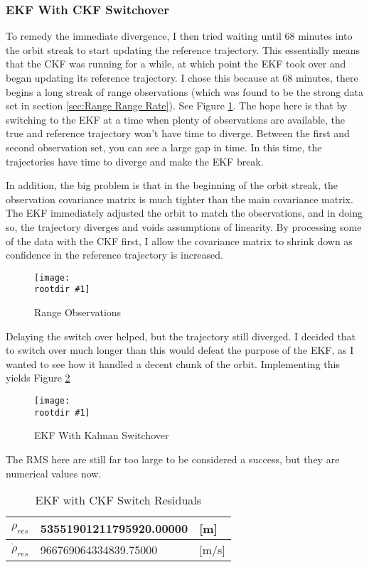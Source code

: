 \documentclass[12pt,a4paper,oneside]{article}
\numberwithin{equation}{section}   		%
\newcommand{\rootdir}{./Figures/}
\newcommand{\figH}[3]{
			\begin{figure}[H]
				\centering
				\texttt{[image: \\rootdir \#1]}
				\caption{#2}
				\label{#3}
			\end{figure}
			}
\newcommand{\fig}[3]{
			\begin{figure}
				\centering
				\texttt{[image: \\rootdir \#1]}
				\caption{#2}
				\label{#3}
			\end{figure}
			}
\begin{document}
\subsubsection{EKF With CKF Switchover}
\label{sec:EKF Kalman Switch}

To remedy the immediate divergence, I then tried waiting until 68 minutes into the orbit streak to start updating the reference trajectory. This essentially means that the CKF was running for a while, at which point the EKF took over and began updating its reference trajectory. I chose this because at 68 minutes, there begins a long streak of range observations (which was found to be the strong data set in section \ref{sec:Range Range Rate}). See Figure \ref{fig:Obs Switch}. The hope here is that by switching to the EKF at a time when plenty of observations are available, the true and reference trajectory won't have time to diverge. Between the first and second observation set, you can see a large gap in time. In this time, the trajectories have time to diverge and make the EKF break. 

In addition, the big problem is that in the beginning of the orbit streak, the observation covariance matrix is much tighter than the main covariance matrix. The EKF immediately adjusted the orbit to match the observations, and in doing so, the trajectory diverges and voids assumptions of linearity. By processing some of the data with the CKF first, I allow the covariance matrix to shrink down as confidence in the reference trajectory is increased. 

\figH{ObsSwitch.eps}{Range Observations}{fig:Obs Switch}

Delaying the switch over helped, but the trajectory still diverged. I decided that to switch over much longer than this would defeat the purpose of the EKF, as I wanted to see how it handled a decent chunk of the orbit. Implementing this yields Figure \ref{fig:EKF2}

\fig{EKF2.eps}{EKF With Kalman Switchover}{fig:EKF2}

The RMS here are still far too large to be considered a success, but they are numerical values now. 


\begin{table}[H]
\centering
	\begin{tabular}{|l|l|l|}
		\hline
		$\rho_{res}$		&	53551901211795920.00000		& [m]		\\\hline
		$\dot{\rho}_{res}$	&	966769064334839.75000 	& [m/s] 	\\\hline
	\end{tabular}
	\caption{EKF with CKF Switch Residuals}
	\label{tab:EKF2}
\end{table}
\end{document}
